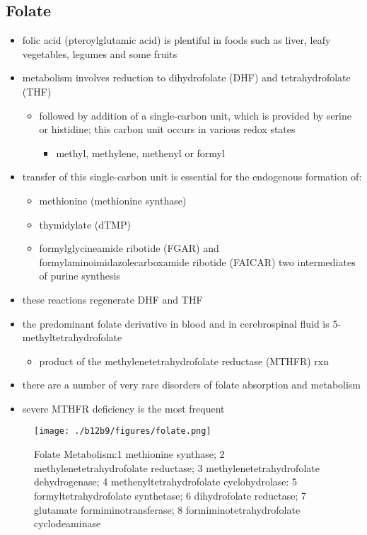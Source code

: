 \documentclass{scrartcl}
\begin{document}
\subsection{Folate}
\label{sec:org8ce11c4}
\begin{itemize}
\item folic acid (pteroylglutamic acid) is plentiful in foods such as
liver, leafy vegetables, legumes and some fruits
\item metabolism involves reduction to dihydrofolate (DHF) and
tetrahydrofolate (THF)
\begin{itemize}
\item followed by addition of a single-carbon unit, which is provided by
serine or histidine; this carbon unit occurs in various redox
states
\begin{itemize}
\item methyl, methylene, methenyl or formyl
\end{itemize}
\end{itemize}
\item transfer of this single-carbon unit is essential for the endogenous
formation of:
\begin{itemize}
\item methionine (methionine synthase)
\item thymidylate (dTMP)
\item formylglycineamide ribotide (FGAR) and
formylaminoimidazolecarboxamide ribotide (FAICAR) two
intermediates of purine synthesis
\end{itemize}
\item these reactions regenerate DHF and THF
\item the predominant folate derivative in blood and in cerebrospinal
fluid is 5-methyltetrahydrofolate
\begin{itemize}
\item product of the methylenetetrahydrofolate reductase (MTHFR) rxn
\end{itemize}
\item there are a number of very rare disorders of folate absorption and metabolism
\item severe MTHFR deficiency is the most frequent
\end{itemize}

\begin{figure}[htbp]
\centering
\texttt{[image: ./b12b9/figures/folate.png]}
\caption{\label{fig:org3908962}
Folate Metabolism:1 methionine synthase; 2 methylenetetrahydrofolate reductase; 3 methylenetetrahydrofolate dehydrogenase; 4 methenyltetrahydrofolate cyclohydrolase: 5 formyltetrahydrofolate synthetase; 6 dihydrofolate reductase; 7 glutamate formiminotransferase; 8 formiminotetrahydrofolate cyclodeaminase}
\end{figure}
\end{document}
